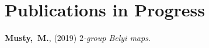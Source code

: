\newcommand{\arxiv}[1]{[\href{http://arxiv.org/abs/#1}{arXiv:#1}]}


\setcounter{numPubs}{4}
\setcounter{pubCounter}{\value{numPubs}}

\section{\sc Publications in Progress}
\begin{etaremune}[start=\value{pubCounter}]
\item
  {\bf Musty,~M.},
  (2019)
  {\it $2$-group Belyi maps}.
  \setcounter{pubCounter}{\value{enumi}}
\end{etaremune}



